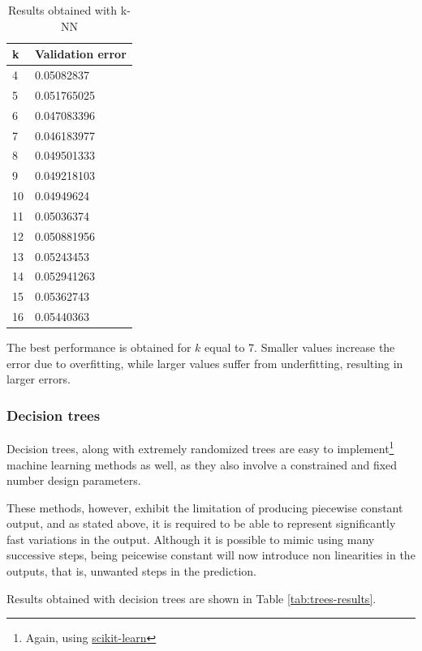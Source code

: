 \begin{table}[h]
    \centering
    \begin{tabular}{|l|l|}
        \hline
        k & Validation error \\ \hline
        4  & 0.05082837 \\
        5  & 0.051765025 \\
        6  & 0.047083396 \\
        7  & 0.046183977 \\
        8  & 0.049501333 \\
        9  & 0.049218103 \\
        10 & 0.04949624 \\
        11 & 0.05036374 \\
        12 & 0.050881956 \\
        13 & 0.05243453 \\
        14 & 0.052941263 \\
        15 & 0.05362743 \\
        16 & 0.05440363 \\ \hline
    \end{tabular}
    \caption{Results obtained with k-NN}
    \label{tab:results-knn}
\end{table}

The best performance is obtained for $k$ equal to 7. Smaller values increase the error due to overfitting, while larger values suffer from underfitting, resulting in larger errors.

\subsubsection{Decision trees}

Decision trees, along with extremely randomized trees \cite{extremely-randomized-trees} are easy to implement\footnote{Again, using \href{https://scikit-learn.org/stable/modules/ensemble.html\#forests-of-randomized-trees}{scikit-learn}} machine learning methods as well, as they also involve a constrained and fixed number design parameters.

These methods, however, exhibit the limitation of producing piecewise constant output, and as stated above, it is required to be able to represent significantly fast variations in the output. Although it is possible to mimic using many successive steps, being peicewise constant will now introduce non linearities in the outputs, that is, unwanted steps in the prediction.

Results obtained with decision trees are shown in Table \ref{tab:trees-results}.


